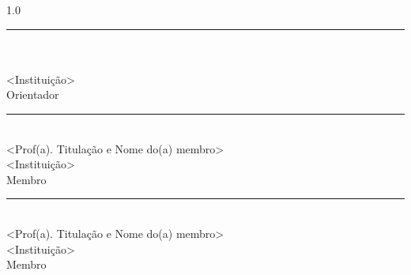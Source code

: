 \begin{center}
  \begin{Spacing}{1.0}
    \rule{0.7\textwidth}{0.4pt}\\
    \titulacaoorientador{} \imprimirorientador\\
    <Instituição>\\
    Orientador

    \vspace{0.55cm}
    \rule{0.7\textwidth}{0.4pt}\\
    <Prof(a). Titulação e Nome do(a) membro>\\
    <Instituição>\\
    Membro

    \vspace{0.55cm}
    \rule{0.7\textwidth}{0.4pt}\\
    <Prof(a). Titulação e Nome do(a) membro>\\
    <Instituição>\\
    Membro
  \end{Spacing}
\end{center}

